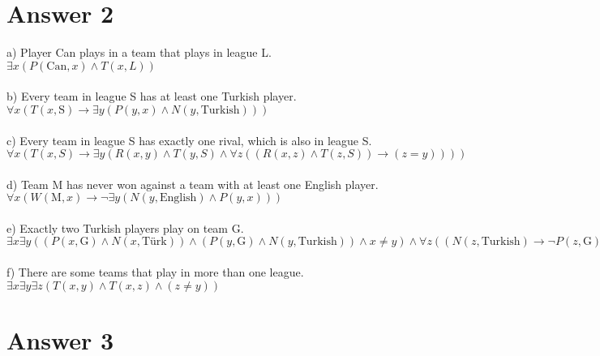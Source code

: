 \documentclass[12pt]{article}
\begin{document}
\section*{Answer 2}

a) Player Can plays in a team that plays in league L.  \\
$\exists x (P(\text{Can}, x) \land T(x, L))$ \\
 \\
b) Every team in league S has at least one Turkish player. \\
$\forall x (T(x, \text{S}) \to \exists y (P(y, x) \land  N(y, \text{Turkish})))$ \\
 \\
c) Every team in league S has exactly one rival, which is also in league S. \\
$\forall x (T(x, S) \to \exists y (R(x, y) \land T(y, S) \land \forall z ((R(x, z) \land T(z, S) )\to (z = y))))$ \\
 \\
d) Team M has never won against a team with at least one English player. \\
$\forall x (W(\text{M}, x) \to \neg \exists y (N(y, \text{English}) \land P(y, x)))$ \\
 \\
e) Exactly two Turkish players play on team G. \\
$\exists x  \exists y((P(x, \text{G}) \land N(x, \text{Türk})) \land  (P(y, \text{G}) \land N(y, \text{Turkish})) \land x \neq y ) \land \forall z ((N(z, \text{Turkish}) \to \neg P(z, \text{G})) \land (z \neq x \land z \neq y))$ \\
 \\
f) There are some teams that play in more than one league. \\
$\exists x \exists y \exists z(T(x, y) \land T(x, z)  \land (z \neq y))$ \\

\section*{Answer 3}
\end{document}
